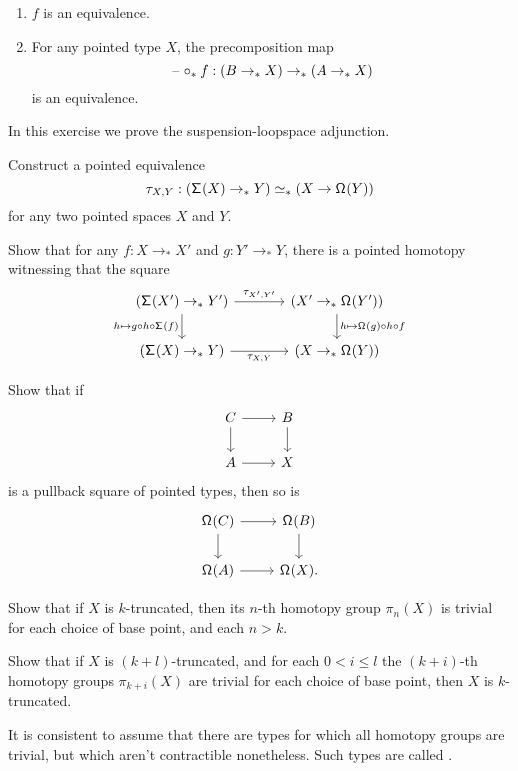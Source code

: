 \begin{exercises}
\begin{enumerate}
\item $f$ is an equivalence.
\item For any pointed type $X$, the precomposition map
\begin{equation*}
\mathord{\hspace{1pt}\text{--}\hspace{1pt}}\mathbin{\circ_\ast}f:(B\to_\ast X)\to_\ast (A\to_\ast X)
\end{equation*}
is an equivalence. 
\end{enumerate}
\item In this exercise we prove the suspension-loopspace adjunction.
\begin{subexenum}
\item Construct a pointed equivalence
\begin{equation*}
\tau_{X,Y}:(\mathsf{\Sigma}^{}(X)\to_\ast Y) \simeq_\ast (X\to \mathsf{\Omega}^{}(Y))
\end{equation*}
for any two pointed spaces $X$ and $Y$.
\item Show that for any $f:X\to_\ast X'$ and $g:Y'\to_\ast Y$, there is a pointed homotopy witnessing that the square
\begin{equation*}
\begin{tikzcd}[column sep=large]
(\susp(X')\to_\ast Y') \arrow[r,"\tau_{X',Y'}"] \arrow[d,swap,"h\mapsto g\circ h\circ \susp(f)"] & (X'\to_\ast \loopspace{Y'}) \arrow[d,"h\mapsto\loopspace{g}\circ h\circ f"] \\
(\susp(X)\to_\ast Y) \arrow[r,swap,"\tau_{X,Y}"] & (X\to_\ast \loopspace{Y})
\end{tikzcd}
\end{equation*}
\end{subexenum}
\item Show that if
\begin{equation*}
\begin{tikzcd}
C \arrow[r] \arrow[d] & B \arrow[d] \\
A \arrow[r] & X
\end{tikzcd}
\end{equation*}
is a pullback square of pointed types, then so is
\begin{equation*}
\begin{tikzcd}
\loopspace{C} \arrow[r] \arrow[d] & \loopspace{B} \arrow[d] \\
\loopspace{A} \arrow[r] & \loopspace{X}.
\end{tikzcd}
\end{equation*}
\item 
\begin{subexenum}
\item Show that if $X$ is $k$-truncated, then its $n$-th homotopy group $\pi_n(X)$ is trivial for each choice of base point, and each $n> k$.
\item Show that if $X$ is $(k+l)$-truncated, and for each $0< i\leq l$ the $(k+i)$-th homotopy groups $\pi_{k+i}(X)$ are trivial for each choice of base point, then $X$ is $k$-truncated.
\end{subexenum}
It is consistent to assume that there are types for which all homotopy groups are trivial, but which aren't contractible nonetheless. Such types are called .
\end{exercises}
